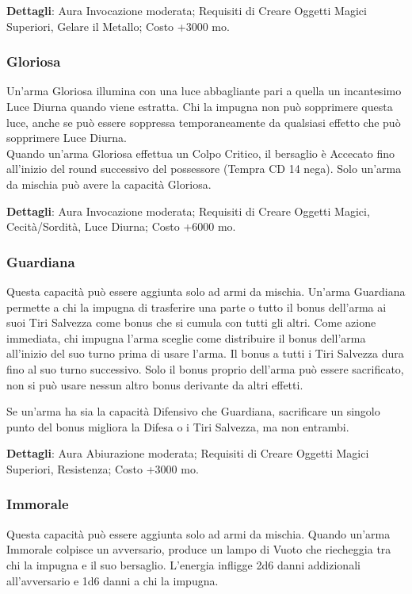 \begin{multicols}{2}
\textbf{Dettagli}: Aura Invocazione moderata; Requisiti di Creare Oggetti Magici Superiori, Gelare il Metallo; Costo +3000 mo.

\subsubsection{Gloriosa}

Un'arma Gloriosa illumina con una luce abbagliante pari a quella un incantesimo Luce Diurna quando viene estratta. Chi la impugna non può sopprimere questa luce, anche se può essere soppressa temporaneamente da qualsiasi effetto che può sopprimere Luce Diurna. \\
Quando un'arma Gloriosa effettua un Colpo Critico, il bersaglio è Accecato fino all'inizio del round successivo del possessore (Tempra CD 14 nega). Solo un'arma da mischia può avere la capacità Gloriosa.

\textbf{Dettagli}: Aura Invocazione moderata; Requisiti di Creare Oggetti Magici, Cecità/Sordità,  Luce Diurna; Costo +6000 mo.

\subsubsection{Guardiana}

Questa capacità può essere aggiunta solo ad armi da mischia. Un'arma Guardiana permette a chi la impugna di trasferire una parte o tutto il bonus dell'arma ai suoi Tiri Salvezza come bonus che si cumula con tutti gli altri. Come azione immediata, chi impugna l'arma sceglie come distribuire il bonus dell'arma all'inizio del suo turno prima di usare l'arma. Il bonus a tutti i Tiri Salvezza dura fino al suo turno successivo. Solo il bonus proprio dell'arma può essere sacrificato, non si può usare nessun altro bonus derivante da altri effetti.

Se un'arma ha sia la capacità Difensivo che Guardiana, sacrificare un singolo punto del bonus migliora la Difesa o i Tiri Salvezza, ma non entrambi.

\textbf{Dettagli}: Aura Abiurazione moderata; Requisiti di Creare Oggetti Magici Superiori, Resistenza; Costo +3000 mo.

\subsubsection{Immorale}

Questa capacità può essere aggiunta solo ad armi da mischia. Quando un'arma Immorale colpisce un avversario, produce un lampo di Vuoto che riecheggia tra chi la impugna e il suo bersaglio. L'energia infligge 2d6 danni addizionali all'avversario e 1d6 danni a chi la impugna.


\end{multicols}
